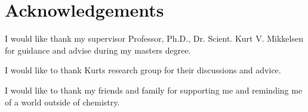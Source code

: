 \chapter*{Acknowledgements}
\label{chap:acknowl}

I would like thank my supervisor Professor,  Ph.D.,  Dr.  Scient. Kurt V. Mikkelsen for guidance and advise during my masters degree.

I would like to thank Kurts research group for their discussions and advice.

I would like to thank my friends and family for supporting me and reminding me of a world outside of chemistry.